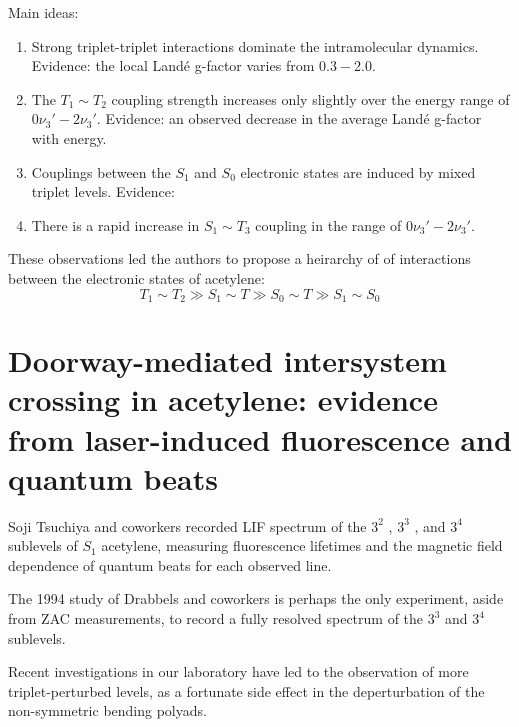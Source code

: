 \documentclass[12pt]{mitthesis}
\begin{document}

Main ideas:
\begin{enumerate}

\item Strong triplet-triplet interactions dominate the intramolecular
  dynamics.  Evidence: the local Land\'{e} g-factor varies from
  $0.3-2.0$.

\item The $T_1 \sim T_2$ coupling strength increases only slightly over
  the energy range of $0\nu_3'-2\nu_3'$.  Evidence: an observed
  decrease in the average Land\'{e} g-factor with energy.

\item Couplings between the $S_1$ and $S_0$ electronic states are
  induced by mixed triplet levels.  Evidence: 

\item There is a rapid increase in $S_1 \sim T_3$ coupling in the range of
  $0\nu_3'-2\nu_3'$. 

\end{enumerate}
These observations led the authors to propose a heirarchy of of
interactions between the electronic states of acetylene:
\begin{equation}
  T_1 \sim T_2 \gg S_1 \sim T \gg S_0 \sim T \gg S_1 \sim S_0
\end{equation}

\section{Doorway-mediated intersystem crossing in acetylene: evidence
  from laser-induced fluorescence and quantum beats}

Soji Tsuchiya and coworkers recorded LIF spectrum of the $3^2$ ,
$3^3$ , and $3^4$  sublevels of $S_1$ acetylene, measuring
fluorescence lifetimes and the magnetic field dependence of quantum
beats for each observed line.

The 1994 study of Drabbels and coworkers is perhaps the only
experiment, aside from ZAC measurements, to record a fully
resolved spectrum of the $3^3$  and $3^4$  sublevels.

Recent investigations in our laboratory have led to the observation of
more triplet-perturbed levels, as a fortunate side effect in the
deperturbation of the non-symmetric bending polyads.
\end{document}
